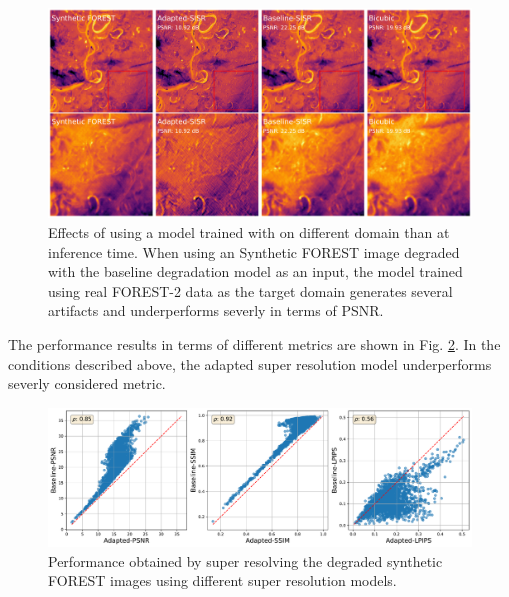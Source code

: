         \begin{figure}[H]
            \centering
            \includegraphics[scale=0.28]{Includes/5-target-prediction-with-domain-gap.pdf}
            \caption{Effects of using a model trained with on different domain than at inference time. 
                     When using an Synthetic FOREST image degraded with the baseline degradation model as an input, the model trained using real FOREST-2 data as the target domain generates several artifacts and underperforms severly in terms of PSNR. }
            \label{fig:5-target-prediction-with-domain-gap}
        \end{figure}

        The performance results in terms of different metrics are shown in Fig. \ref{fig:5-target-prediction-with-domain-gap-dataset}. 
        In the conditions described above, the adapted super resolution model underperforms severly considered metric.


        \begin{figure}[H]
            \centering
            \includegraphics[scale=0.38]{Includes/5-target-prediction-with-domain-gap-dataset.pdf}
            \caption{Performance obtained by super resolving the degraded synthetic FOREST images using different super resolution models.}
            \label{fig:5-target-prediction-with-domain-gap-dataset}
        \end{figure}



